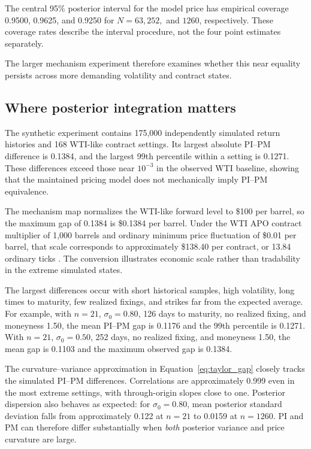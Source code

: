The central 95\% posterior interval for the model price has empirical coverage 0.9500, 0.9625, and 0.9250 for $N=63,252,$ and $1260$, respectively. These coverage rates describe the interval procedure, not the four point estimates separately.

The larger mechanism experiment therefore examines whether this near equality persists across more demanding volatility and contract states.

\subsection{Where posterior integration matters}

The synthetic experiment contains 175,000 independently simulated return histories and 168 WTI-like contract settings. Its largest absolute PI--PM difference is 0.1384, and the largest 99th percentile within a setting is 0.1271. These differences exceed those near $10^{-3}$ in the observed WTI baseline, showing that the maintained pricing model does not mechanically imply PI--PM equivalence.

The mechanism map normalizes the WTI-like forward level to \$100 per barrel, so the maximum gap of 0.1384 is \$0.1384 per barrel. Under the WTI APO contract multiplier of 1,000 barrels and ordinary minimum price fluctuation of \$0.01 per barrel, that scale corresponds to approximately \$138.40 per contract, or 13.84 ordinary ticks \cite{cme_wti_apo_rule}. The conversion illustrates economic scale rather than tradability in the extreme simulated states.

The largest differences occur with short historical samples, high volatility, long times to maturity, few realized fixings, and strikes far from the expected average. For example, with $n=21$, $\sigma_0=0.80$, 126 days to maturity, no realized fixing, and moneyness 1.50, the mean PI--PM gap is 0.1176 and the 99th percentile is 0.1271. With $n=21$, $\sigma_0=0.50$, 252 days, no realized fixing, and moneyness 1.50, the mean gap is 0.1103 and the maximum observed gap is 0.1384.

The curvature--variance approximation in Equation~\eqref{eq:taylor_gap} closely tracks the simulated PI--PM differences. Correlations are approximately 0.999 even in the most extreme settings, with through-origin slopes close to one. Posterior dispersion also behaves as expected: for $\sigma_0=0.80$, mean posterior standard deviation falls from approximately 0.122 at $n=21$ to 0.0159 at $n=1260$. PI and PM can therefore differ substantially when \emph{both} posterior variance and price curvature are large.

